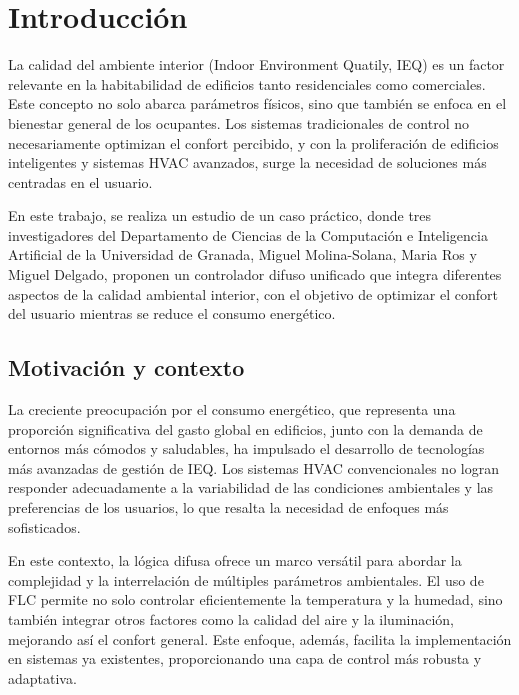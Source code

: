 \section{Introducción}

La calidad del ambiente interior (Indoor Environment Quatily, IEQ) es un factor relevante en la habitabilidad de edificios tanto residenciales como comerciales. Este concepto no solo abarca parámetros físicos, sino que también se enfoca en el bienestar general de los ocupantes. Los sistemas tradicionales de control no necesariamente optimizan el confort percibido, y con la proliferación de edificios inteligentes y sistemas HVAC avanzados, surge la necesidad de soluciones más centradas en el usuario.

En este trabajo, se realiza un estudio de un caso práctico, donde tres investigadores del Departamento de Ciencias de la Computación e Inteligencia Artificial de la Universidad de Granada, Miguel Molina-Solana, Maria Ros y Miguel Delgado, proponen un controlador difuso unificado que integra diferentes aspectos de la calidad ambiental interior, con el objetivo de optimizar el confort del usuario mientras se reduce el consumo energético.

\subsection{Motivación y contexto}

La creciente preocupación por el consumo energético, que representa una proporción significativa del gasto global en edificios, junto con la demanda de entornos más cómodos y saludables, ha impulsado el desarrollo de tecnologías más avanzadas de gestión de IEQ. Los sistemas HVAC convencionales no logran responder adecuadamente a la variabilidad de las condiciones ambientales y las preferencias de los usuarios, lo que resalta la necesidad de enfoques más sofisticados.

En este contexto, la lógica difusa ofrece un marco versátil para abordar la complejidad y la interrelación de múltiples parámetros ambientales. El uso de FLC permite no solo controlar eficientemente la temperatura y la humedad, sino también integrar otros factores como la calidad del aire y la iluminación, mejorando así el confort general. Este enfoque, además, facilita la implementación en sistemas ya existentes, proporcionando una capa de control más robusta y adaptativa.

\begin{comment}
	contenidos...
	\begin{figure}[H]
		\centering
		\texttt{[image: imgs/INE-grafica1.jpeg]}
		\caption{Población por grupos de edad que han usado Internet en los últimos tres meses (INE, 2018-23)}
		\label{fig:grafica1-INE}
	\end{figure}
	
	
	\autoref{fig:...}
\end{comment}


